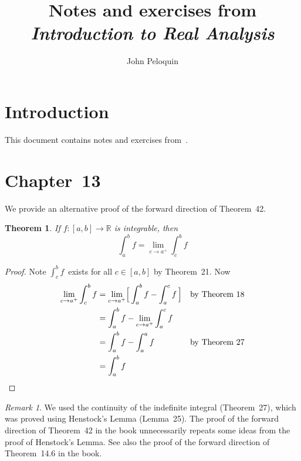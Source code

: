 \documentclass[letterpaper,12pt]{article}
\title{Notes and exercises from\\\textit{Introduction to Real Analysis}}
\author{John Peloquin}
\date{}
\newcommand{\R}{\mathbb{R}}
\theoremstyle{plain}
\newtheorem*{thm}{Theorem}
\theoremstyle{definition}
\theoremstyle{remark}
\newtheorem*{rmk}{Remark}
\begin{document}
\maketitle

\section*{Introduction}
This document contains notes and exercises from~\cite{depree}.

\section*{Chapter~13}
We provide an alternative proof of the forward direction of Theorem~42.
\begin{thm} If \(f:[a,b]\to\R\) is integrable, then
\[\int_a^b f=\lim_{c\to a^+}\int_c^b f\]
\end{thm}
\begin{proof}
Note \(\int_c^b f\)~exists for all \(c\in[a,b]\) by Theorem~21. Now
\begin{align*}
\lim_{c\to a^+}\int_c^b f&=\lim_{c\to a^+}\Bigl[\,\int_a^b f-\int_a^c f\,\Bigr]&&\text{by Theorem~18}\\
	&=\int_a^b f-\lim_{c\to a^+}\int_a^c f&&\\
	&=\int_a^b f-\int_a^a f&&\text{by Theorem~27}\\
	&=\int_a^b f&&\qedhere
\end{align*}
\end{proof}
\begin{rmk}
We used the continuity of the indefinite integral (Theorem~27), which was proved using Henstock's Lemma (Lemma~25). The proof of the forward direction of Theorem~42 in the book unnecessarily repeats some ideas from the proof of Henstock's Lemma. See also the proof of the forward direction of Theorem~14.6 in the book.
\end{rmk}
\end{document}

